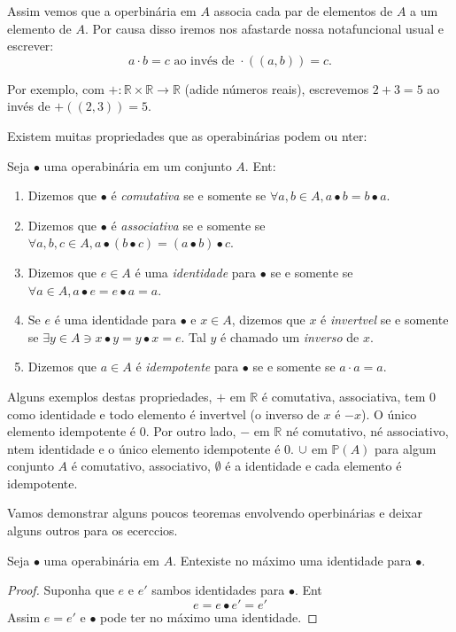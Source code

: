 Assim vemos que a oper\cao bin\'aria em $A$ associa cada par de elementos de $A$ a um elemento de $A$. Por causa disso iremos nos afastarde nossa nota\cao funcional usual e escrever:
\[
a\cdot b=c \textrm{ ao inv\'es de } \cdot((a,b))=c.
\]

Por exemplo, com $+:\mathbb{R}\times\mathbb{R}\to\mathbb{R}$ (adi\cao de n\'umeros reais), escrevemos $2+3=5$ ao inv\'es de $+((2,3))=5$.

Existem muitas propriedades que as opera\coes bin\'arias podem ou n\ao ter:
\begin{definb}
Seja $\bullet$ uma opera\cao bin\'aria em um conjunto $A$. Ent\aoi:
\begin{enumerate}[{\bf a)}]
\item Dizemos que $\bullet$ \'e {\it comutativa} se e somente se $\forall a,b\in A, a\bullet b=b\bullet a$.
\item Dizemos que $\bullet$ \'e {\it associativa} se e somente se $\forall a,b,c\in A, a\bullet(b\bullet c)=(a\bullet b)\bullet c$.
\item Dizemos que $e\in A$ \'e uma {\it identidade} para $\bullet$ se e somente se $\forall a\in A, a\bullet e=e\bullet a=a$.
\item Se $e$ \'e uma identidade para $\bullet$ e $x\in A$, dizemos que $x$ \'e {\it invert\ih vel} se e somente se $\exists y\in A \ni x\bullet y=y\bullet x=e$. Tal $y$ \'e chamado um {\it inverso} de $x$.
\item Dizemos que $a\in A$ \'e {\it idempotente} para $\bullet$ se e somente se $a\cdot a=a$.
\end{enumerate}
\end{definb}

Alguns exemplos destas propriedades, $+$ em $\mathbb{R}$ \'e comutativa, associativa, tem $0$ como identidade e todo elemento \'e invert\ih vel (o inverso de $x$ \'e $-x$). O \'unico elemento idempotente \'e $0$. Por outro lado, $-$ em $\mathbb{R}$ n\ao \'e comutativo, n\ao \'e associativo, n\ao tem identidade e o \'unico elemento idempotente \'e $0$. $\cup$ em $\mathbb{P}(A)$ para algum conjunto $A$ \'e comutativo, associativo, $\emptyset$ \'e a identidade e cada elemento \'e idempotente.

Vamos demonstrar alguns poucos teoremas envolvendo oper\coes bin\'arias e deixar alguns outros para os ecerc\ih cios.
\begin{teob}
Seja $\bullet$ uma opera\cao bin\'aria em $A$. Ent\ao existe no m\'aximo uma identidade para $\bullet$.
\end{teob}
\begin{proof}
Suponha que $e$ e $e'$ s\ao ambos identidades para $\bullet$. Ent\ao
\[
e=e\bullet e'=e'
\]
Assim $e=e'$ e $\bullet$ pode ter no m\'aximo uma identidade.

\end{proof}
\\

